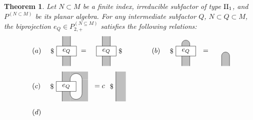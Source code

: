 \documentclass[11pt,letterpaper]{amsart}
\newtheorem{theorem}{Theorem}[section]
\theoremstyle{definition}
\theoremstyle{remark}
\def\ss{\subset}
\begin{document}
\begin{theorem}\label{Bisch}\cite{Bi1,BiJo2,La}  Let $N \ss M$  be a finite index, irreducible subfactor of type ${\rm II}_1$, and $P^{(N\ss M)}$ be its planar algebra.
For any intermediate subfactor $Q$, $N \ss Q \ss M$, the biprojection $e_Q \in P^{(N\subseteq M)}_{2,+}$ satisfies the following relations:  
\begin{align*}
&\begin{tikzpicture}
\node at (-1,.25) {$(a)$};
\path [fill=lightgray] (.3,-.5) rectangle (.7,1);
\draw (.3,-.5)--(.3,1);
\draw (.7,1)--(.7,-.5);
\draw [fill=white](0,0) rectangle (1,.5);
\node at (0,.25) [left] {$\$$};
\node at (.5,.25) {$e_Q$};
\node at (1.1,.25)[right] {$=$};
\path [fill=lightgray] (2.3,-.5) rectangle (2.7,1);
\draw (2.3,-.5)--(2.3,1);
\draw (2.7,1)--(2.7,-.5);
\draw [fill=white] (2,0) rectangle (3,.5);
\node at (2.5,.25) {$e_Q$};
\node at (3,.25)[right]{$\$$};
\node at (5,.25) {$(b)$};
\path [fill=lightgray] (6.3,-.5)--(6.3,.6) arc [radius=.2,start angle=180,end angle=0]--(6.7,-.5);
\draw (6.3,-.5)--(6.3,.6);
\draw (6.7,-.5)--(6.7,.6);
\draw (6.7,.6) arc [radius=.2,start angle=0, end angle=180];
\draw [fill=white](6,0) rectangle (7,.5);
\node at (6,.25)[left] {$\$$};
\node at (6.5,.25) {$e_Q$};
\node at (7.5,.25) {$=$};
\path [fill=lightgray] (8.3,-.5)--(8.3,0) arc[radius=.2,start angle=180, end angle=0]--(8.7,-.5);
\draw (8.3,0) arc[radius=.2,start angle=180, end angle=0];
\draw (8.3,0)--(8.3,-.5);
\draw (8.7,0)--(8.7,-.5);
\end{tikzpicture}\\
&\begin{tikzpicture}
\node at (-1,.25) {$(c)$};
\path [fill=lightgray](.3,-.5) rectangle (.7,1);
\path [fill=lightgray] (.7,1)--(.7,.6) arc[radius=.3,start angle=180, end angle=0]--(1.3,.6)--(1.6,.6)--(1.6,1);
\path [fill=lightgray] (.7,-.5)--(.7,-.1) arc[radius=.3,start angle=180, end angle=360]--(1.3,.6)--(1.6,.6)--(1.6,-.1)--(1.6,-.5);
\draw (.3,-.5)--(.3,1);
\draw (.7,.6)--(.7,-.1);
\draw (.7,.6) arc[radius=.3, start angle=180, end angle=0];
\draw (1.3,.6)--(1.3,-.1);
\draw (.7,-.1) arc[radius=.3, start angle=180, end angle=360];
\draw [fill=white] (0,0) rectangle (1,.5);
\node at (0,.25)[left] {$\$$};
\node at (.5,.25) {$e_Q$};
\node at (1.8,.25) [right] {$=c$};
\path [fill=lightgray](3,1) rectangle (3.5,-.5);
\draw (3,1)--(3,-.5);
\node at (3,.25) [left]{$\$$};
\end{tikzpicture}\\
&\begin{tikzpicture}
\node at (-1,.25) {$(d)$};

\end{tikzpicture}
\end{align*}
\end{theorem}
\end{document}
